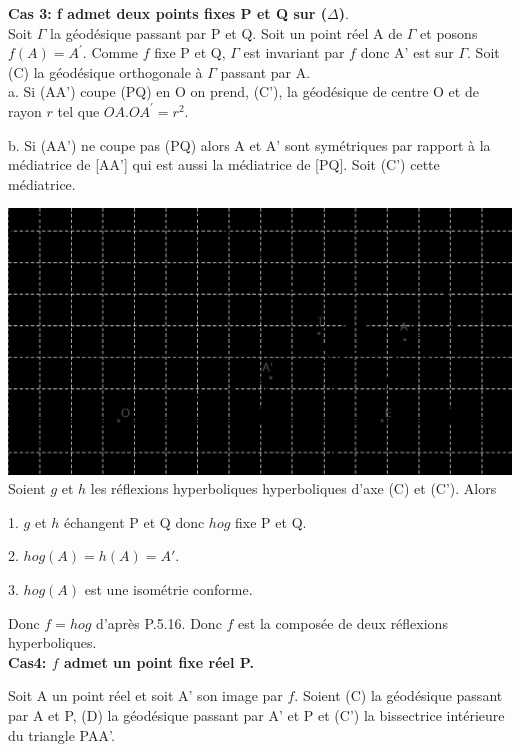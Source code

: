 \documentclass[a4paper, 12pt, twoside]{book}
\begin{document}
  \textbf{Cas 3: f admet deux points fixes P et Q sur ($\Delta$)}.\\
  
  
 

 Soit $\Gamma$ la géodésique passant par P et Q. Soit un point réel A de $\Gamma$ et posons $f(A)=A^{'}$. Comme $f$ fixe P et Q, $\Gamma$ est invariant par $f$ donc A' est sur $\Gamma$. Soit (C) la géodésique orthogonale à $\Gamma$ passant par A.\\

a. Si (AA') coupe (PQ) en O on prend, (C'), la géodésique  de centre O et de rayon $r$ tel que $OA.OA^{'}=r^{2}$.\


b. Si (AA') ne coupe pas (PQ) alors A et A' sont symétriques par rapport à la médiatrice de [AA'] qui est aussi la médiatrice de [PQ].  Soit (C') cette  médiatrice.\


  \includegraphics[scale=0.7]{figures/isom6.eps}\\

Soient $g$ et $h$ les réflexions hyperboliques hyperboliques d'axe (C) et (C'). Alors\

1. $g$ et $h$ échangent P et Q donc $hog$ fixe P et Q.\

2. $hog(A)=h(A)=A'$.\

3. $hog(A)$ est une isométrie conforme.\

Donc $f=hog$ d'après P.5.16. Donc $f$ est la composée de deux réflexions hyperboliques.\\ 


 \textbf{Cas4:  $f$ admet un point fixe réel P.}\

Soit A un point réel et soit A' son image par $f$. Soient (C) la géodésique passant par A et P, (D) la géodésique passant par A' et P et (C') la bissectrice intérieure du triangle PAA'. \\
 
\end{document}
